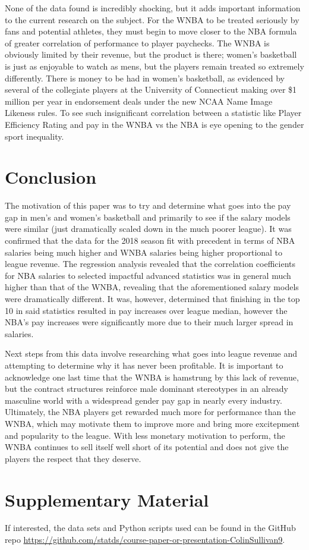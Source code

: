 \documentclass[12pt]{article}
\begin{document}
\par
None of the data found is incredibly shocking, but it adds important information to the current research on the subject. For the WNBA to be treated seriously by fans and potential athletes, they must begin to move closer to the NBA formula of greater correlation of performance to player paychecks. The WNBA is obviously limited by their revenue, but the product is there; women’s basketball is just as enjoyable to watch as mens, but the players remain treated so extremely differently. There is money to be had in women’s basketball, as evidenced by several of the collegiate players at the University of Connecticut making over \$1 million per year in endorsement deals under the new NCAA Name Image Likeness rules. To see such insignificant correlation between a statistic like Player Efficiency Rating and pay in the WNBA vs the NBA is eye opening to the gender sport inequality.

\section{Conclusion}
The motivation of this paper was to try and determine what goes into the pay gap in men’s and women’s basketball and primarily to see if the salary models were similar (just dramatically scaled down in the much poorer league). It was confirmed that the data for the 2018 season fit with precedent in terms of NBA salaries being much higher and WNBA salaries being higher proportional to league revenue. The regression analysis revealed that the correlation coefficients for NBA salaries to selected impactful advanced statistics was in general much higher than that of the WNBA, revealing that the aforementioned salary models were dramatically different. It was, however, determined that finishing in the top 10 in said statistics resulted in pay increases over league median, however the NBA’s pay increases were significantly more due to their much larger spread in salaries. 
\par
Next steps from this data involve researching what goes into league revenue and attempting to determine why it has never been profitable. It is important to acknowledge one last time that the WNBA is hamstrung by this lack of revenue, but the contract structures reinforce male dominant stereotypes in an already masculine world with a widespread gender pay gap in nearly every industry. Ultimately, the NBA players get rewarded much more for performance than the WNBA, which may motivate them to improve more and bring more excitepment and popularity to the league. With less monetary motivation to perform, the WNBA continues to sell itself well short of its potential and does not give the players the respect that they deserve. 

\section{Supplementary Material}
If interested, the data sets and Python scripts used can be found in the GitHub repo \url{https://github.com/statds/course-paper-or-presentation-ColinSullivan9}.



\end{document}
